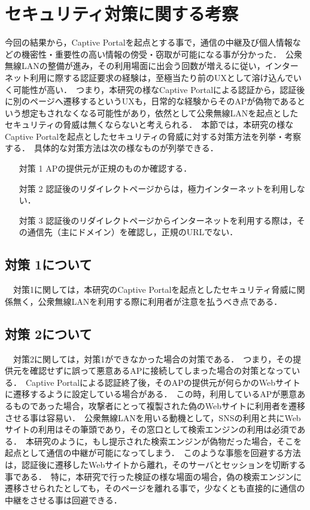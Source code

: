 \documentclass[dvipdfmx]{jsarticle}
\begin{document}
        \section{セキュリティ対策に関する考察}
            今回の結果から，Captive Portalを起点とする事で，通信の中継及び個人情報などの機密性・重要性の高い情報の傍受・窃取が可能になる事が分かった．\
            公衆無線LANの整備が進み，その利用場面に出会う回数が増えるに従い，インターネット利用に際する認証要求の経験は，至極当たり前のUXとして溶け込んでいく可能性が高い．\
            つまり，本研究の様なCaptive Portalによる認証から，認証後に別のページへ遷移するというUXも，日常的な経験からそのAPが偽物であるという想定もされなくなる可能性があり，依然として公衆無線LANを起点としたセキュリティの脅威は無くならないと考えられる．\
            本節では，本研究の様なCaptive Portalを起点としたセキュリティの脅威に対する対策方法を列挙・考察する．\
            具体的な対策方法は次の様なものが列挙できる．\
            \\
            \begin{enumerate}
                \item[対策 1] APの提供元が正規のものか確認する．
                \item[対策 2] 認証後のリダイレクトページからは，極力インターネットを利用しない．
                \item[対策 3] 認証後のリダイレクトページからインターネットを利用する際は，その通信先（主にドメイン）を確認し，正規のURLでない．
            \end{enumerate}
            \subsection{対策 1について}
                　対策1に関しては，本研究のCaptive Portalを起点としたセキュリティ脅威に関係無く，公衆無線LANを利用する際に利用者が注意を払うべき点である．\
            \subsection{対策 2について}
                　対策2に関しては，対策1ができなかった場合の対策である．\
                つまり，その提供元を確認せずに誤って悪意あるAPに接続してしまった場合の対策となっている．\
                Captive Portalによる認証終了後，そのAPの提供元が何らかのWebサイトに遷移するように設定している場合がある．\
                この時，利用しているAPが悪意あるものであった場合，攻撃者にとって複製された偽のWebサイトに利用者を遷移させる事は容易い．\
                公衆無線LANを用いる動機として，SNSの利用と共にWebサイトの利用はその筆頭であり，その窓口として検索エンジンの利用は必須である．\
                本研究のように，もし提示された検索エンジンが偽物だった場合，そこを起点として通信の中継が可能になってしまう．\
                このような事態を回避する方法は，認証後に遷移したWebサイトから離れ，そのサーバとセッションを切断する事である．\
                特に，本研究で行った検証の様な場面の場合，偽の検索エンジンに遷移させられたとしても，そのページを離れる事で，少なくとも直接的に通信の中継をさせる事は回避できる．\
\end{document}
